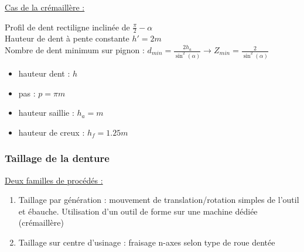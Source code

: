 \documentclass[../main.tex]{subfiles}
\begin{document}
\quad \underline{Cas de la crémaillère :}\\
\begin{minipage}{.5\textwidth}
    Profil de dent rectiligne inclinée de $\frac{\pi}{2}-\alpha$\\
    Hauteur de dent à pente constante $h' = 2m$\\
    Nombre de dent minimum sur pignon : $d_{min} = \frac{2h_a}{\sin^2(\alpha)} \rightarrow Z_{min} = \frac{2}{\sin^2(\alpha)}$\\
\end{minipage}
\begin{minipage}{.5\textwidth}
    \begin{itemize}
        \item hauteur dent : $h$\\
        \item pas : $p = \pi m$\\
        \item hauteur saillie : $h_a = m$\\
        \item hauteur de creux : $h_f = 1.25m$\\
    \end{itemize}
\end{minipage}

\subsubsection{Taillage de la denture}
\quad \underline{Deux familles de procédés :}\\
\begin{enumerate}
    \item Taillage par génération : mouvement de translation/rotation simples de l'outil et ébauche. Utilisation d'un outil de forme sur une machine dédiée (crémaillère)\\
    \item Taillage sur centre d'usinage : fraisage n-axes selon type de roue dentée\\
\end{enumerate}
\end{document}
